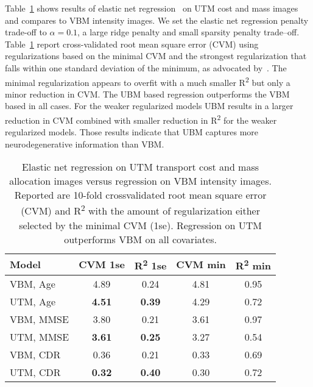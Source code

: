 \documentclass{llncs}
\begin{document}
Table~\ref{fig:prediction} shows results of elastic net
regression~\cite{Zou05regularizationand} on UTM cost and mass images and
compares to VBM intensity images. We set the elastic net regression penalty
trade-off to $\alpha=0.1$, a large ridge penalty and small sparsity penalty
trade--off.  Table~\ref{fig:prediction} report cross-validated root mean square error (CVM) using 
regularizations based on the minimal CVM and the strongest regularization that
falls within one standard deviation of the minimum, as advocated
by~\cite{Zou05regularizationand}.  The minimal regularization appears to
overfit with a much smaller R\textsuperscript{2}  but only a minor reduction in
CVM. The UBM based regression outperforms the VBM based in all cases. For the
weaker regularized models UBM results in a larger reduction in CVM combined
with smaller reduction in R\textsuperscript{2} for the weaker regularized
models. Those results indicate that UBM captures more neurodegenerative
information than VBM.
\begin{table}[h!]
\centering
\begin{tabular}{l|cc|cc}
  \parbox[b][4mm]{25mm }{Model  }  &
  \parbox[b][4mm]{15mm }{\centering CVM 1se }  & 
  \parbox[b][4mm]{15mm }{\centering R\textsuperscript{2}  1se} & 
  \parbox[b][4mm]{15mm }{\centering CVM min }  & 
  \parbox[b][4mm]{15mm }{\centering R\textsuperscript{2}  min} 
        \\ \hline \hline
  VBM, Age   & 4.89        & 0.24         & 4.81  & 0.95 \\
  UTM, Age   & {\bf 4.51}  & {\bf 0.39 }  & 4.29  & 0.72 \\ \hline
  VBM, MMSE  & 3.80        & 0.21         & 3.61  & 0.97 \\
  UTM, MMSE  & {\bf3.61 }  & {\bf 0.25}   & 3.27  & 0.54 \\ \hline
  VBM, CDR   & 0.36        & 0.21         & 0.33  & 0.69 \\
  UTM, CDR   & {\bf 0.32 } & {\bf 0.40 }  & 0.30  & 0.72 \\
\end{tabular} 
\caption{ \label{fig:prediction}  Elastic net regression on UTM transport cost
  and mass allocation images versus regression on VBM intensity images.
  Reported are 10-fold crossvalidated root mean square error (CVM) and
  R\textsuperscript{2} with the amount of regularization either selected by the
  minimal CVM (1se). Regression on UTM outperforms VBM on all covariates.
  \vspace{-10mm}}
\end{table}
\end{document}
